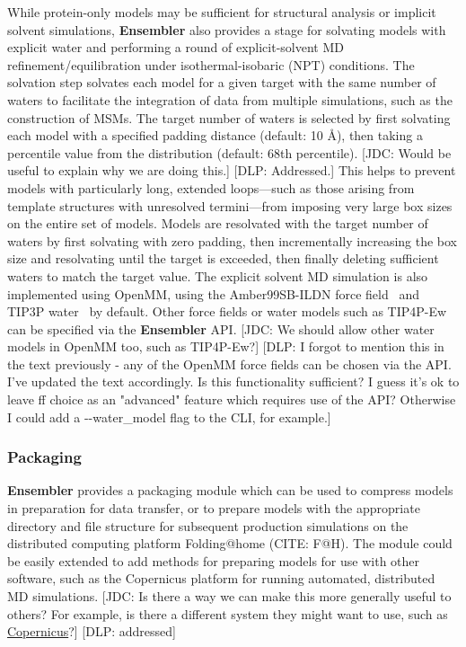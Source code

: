 \documentclass[aps,pre,twocolumn,nofootinbib,superscriptaddress,linenumbers]{revtex4-1}
\begin{document}
While protein-only models may be sufficient for structural analysis or implicit solvent simulations, {\bf Ensembler} also provides a stage for solvating models with explicit water and performing a round of explicit-solvent MD refinement/equilibration under isothermal-isobaric (NPT) conditions.
The solvation step solvates each model for a given target with the same number of waters to facilitate the integration of data from multiple simulations, such as the construction of MSMs.
The target number of waters is selected by first solvating each model with a specified padding distance (default: 10 \AA), then taking a percentile value from the distribution (default: 68th percentile).
{\color{red}[JDC: Would be useful to explain why we are doing this.]}
{\color{blue}[DLP: Addressed.]}
This helps to prevent models with particularly long, extended loops---such as those arising from template structures with unresolved termini---from imposing very large box sizes on the entire set of models.
Models are resolvated with the target number of waters by first solvating with zero padding, then incrementally increasing the box size and resolvating until the target is exceeded, then finally deleting sufficient waters to match the target value.
The explicit solvent MD simulation is also implemented using OpenMM, using the Amber99SB-ILDN force field~\cite{amber99sb-ildn} and TIP3P water~\cite{tip3p} by default.
Other force fields or water models such as TIP4P-Ew~\cite{tip4p-ew} can be specified via the {\bf Ensembler} API.
{\color{red}[JDC: We should allow other water models in OpenMM too, such as TIP4P-Ew?]}
{\color{blue}[DLP: I forgot to mention this in the text previously - any of the OpenMM force fields can be chosen via the API. I've updated the text accordingly. Is this functionality sufficient? I guess it's ok to leave ff choice as an "advanced" feature which requires use of the API? Otherwise I could add a -{}-water\_model flag to the CLI, for example.]}

\subsubsection*{Packaging}

{\bf Ensembler} provides a packaging module which can be used to compress models in preparation for data transfer, or to prepare models with the appropriate directory and file structure for subsequent production simulations on the distributed computing platform Folding@home (CITE: F@H).
The module could be easily extended to add methods for preparing models for use with other software, such as the Copernicus platform for running automated, distributed MD simulations.
{\color{red}[JDC: Is there a way we can make this more generally useful to others?  For example, is there a different system they might want to use, such as \href{http://copernicus.readthedocs.org/en/latest/tutorials/md-tutorial.html#creating-a-workflow-for-molecular-simulations}{Copernicus}?]}
{\color{blue}[DLP: addressed]}
\end{document}
